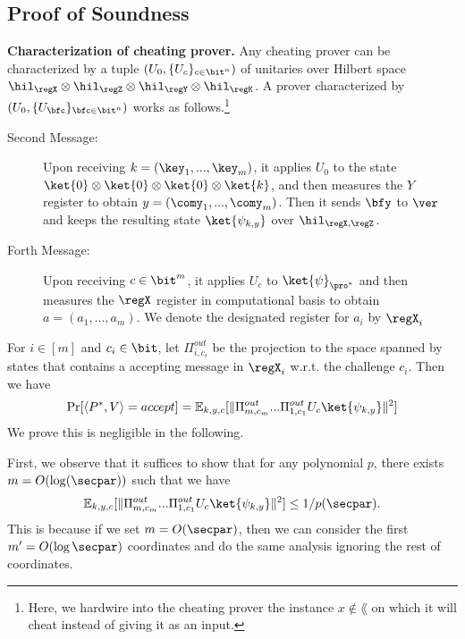 \subsection{Proof of Soundness}
\noindent\textbf{Characterization of cheating prover.}
Any cheating prover can be characterized by a tuple $(U_0,\{U_c\}_{c\in \bit^n})$ of unitaries over Hilbert space $\hil_{\regX}\otimes \hil_{\regZ} \otimes \hil_{\regY}  \otimes \hil_{\regK} $. 
A prover characterized by $(U_0,\{U_{\bfc}\}_{\bfc\in \bit^n})$ works as follows.\footnote{Here, we hardwire into the cheating prover the instance $x\notin \lang$ on which it will cheat instead of giving it as an input.}
\begin{description}
\item[Second Message:] Upon receiving $k=(\key_1,...,\key_m)$, it applies $U_0$ to the state $\ket{0}\otimes\ket{0}\otimes\ket{0}\otimes  \ket{k}$, and then measures the $Y$ register to obtain $y=(\comy_1,...,\comy_m)$. Then it sends $\bfy$ to $\ver$ and keeps the resulting state $\ket{\psi_{k,y}}$ over  $\hil_{\regX,\regZ}$.
\item [Forth Message:] Upon receiving $c\in \bit^{m}$, it applies $U_c$ to $\ket{\psi}_{\pro^*}$ and then measures the $\regX$ register in computational basis to obtain $a=(a_1,...,a_m)$. We denote the designated register for $a_i$ by $\regX_i$ 
\end{description}

For $i\in[m]$ and $c_i\in \bit$, let $\Pi_{i,c_i}^{out}$ be the projection to the space spanned by states that 
contains a accepting message in $\regX_i$ w.r.t. the challenge $c_i$.
Then we have
\begin{align*}
\Pr[\langle P^*,V \rangle=accept]=\mathbb{E}_{k,y,c}[\|\Pi_{m,c_m}^{out}...\Pi_{1,c_1}^{out}U_{c}\ket{\psi_{k,y}}\|^{2}]
\end{align*}
We prove this is negligible in the following.

First, we observe that it suffices to show that for any polynomial $p$, there exists $m=O(\log(\secpar))$ such that we have 
\begin{align*}
\mathbb{E}_{k,y,c}[\|\Pi_{m,c_m}^{out}...\Pi_{1,c_1}^{out}U_{c}\ket{\psi_{k,y}}\|^{2}]\leq 1/p(\secpar).
\end{align*}
This is because if we set $m=O(\secpar)$, then we can consider the first $m'=O(\log \secpar)$ coordinates and do the same analysis ignoring the rest of coordinates.

